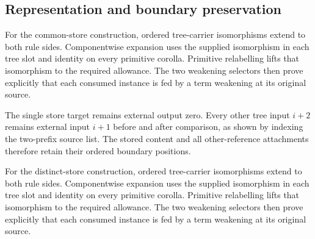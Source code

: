 



\subsection{Representation and boundary preservation}

For the common-store construction, ordered tree-carrier
isomorphisms extend to both rule sides. Componentwise expansion uses the
supplied isomorphism in each tree slot and identity on every primitive
corolla. Primitive relabelling lifts that isomorphism to the required
allowance. The two weakening selectors then prove explicitly that each
consumed instance is fed by a term weakening at its original source.







The single store target remains external output zero. Every other tree
input $i+2$ remains external input $i+1$ before and after comparison, as
shown by indexing the two-prefix source list. The stored content and all
other-reference attachments therefore retain their ordered boundary positions.



For the distinct-store construction, ordered tree-carrier
isomorphisms extend to both rule sides. Componentwise expansion uses the
supplied isomorphism in each tree slot and identity on every primitive
corolla. Primitive relabelling lifts that isomorphism to the required
allowance. The two weakening selectors then prove explicitly that each
consumed instance is fed by a term weakening at its original source.

